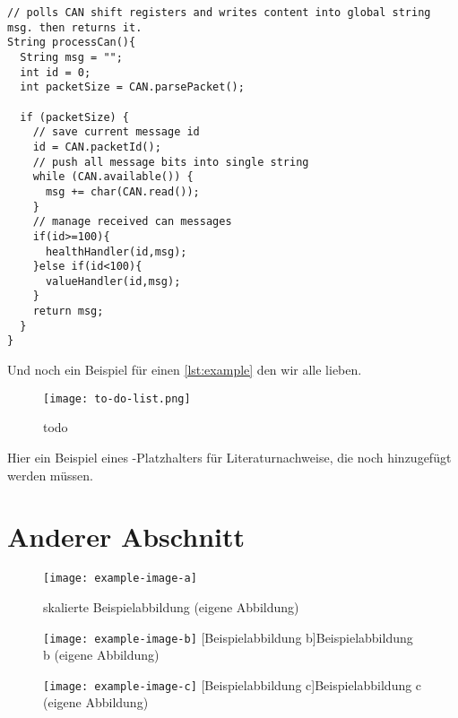 \begin{lstlisting}[caption = C++ Quellcodebeispiel, captionpos = b, label = lst:example]
// polls CAN shift registers and writes content into global string msg. then returns it.
String processCan(){                
  String msg = "";
  int id = 0;
  int packetSize = CAN.parsePacket();

  if (packetSize) {
    // save current message id
    id = CAN.packetId(); 
    // push all message bits into single string
    while (CAN.available()) {       
      msg += char(CAN.read());
    }
    // manage received can messages
    if(id>=100){                    
      healthHandler(id,msg);
    }else if(id<100){
      valueHandler(id,msg);
    } 
    return msg;
  }
}
\end{lstlisting}
Und noch ein Beispiel für einen \cref{lst:example} den wir alle lieben.

\begin{figure}[!ht]
    \centering
    \texttt{[image: to-do-list.png]}
    \caption{todo}
    \label{fig:todo}
\end{figure}

\noindent Hier ein Beispiel eines \textcite{todo}-Platzhalters für Literaturnachweise, die noch hinzugefügt werden müssen.

\clearpage

\section{Anderer Abschnitt}\label{sec:another}

\begin{figure}[!ht]
    \centering
    \texttt{[image: example-image-a]}
    \captionsetup{width=1.0\textwidth}
    \caption[skalierte Beispielabbildung]{skalierte Beispielabbildung (eigene Abbildung)}
    \label{fig:scaledexampleimagea}
\end{figure}

\begin{figure}[!ht]
\centering
    \begin{minipage}[c]{.475\textwidth}
    \centering
        \texttt{[image: example-image-b]}
        [Beispielabbildung b]{Beispielabbildung b (eigene Abbildung)}
        \label{fig:horizontalalignedimageb}
    \end{minipage}\hspace{.025\textwidth}
    \begin{minipage}[c]{.475\textwidth}
        \centering
        \texttt{[image: example-image-c]}
        [Beispielabbildung c]{Beispielabbildung c (eigene Abbildung)}
        \label{fig:horizontalalignedimagec}
    \end{minipage}
\end{figure}

